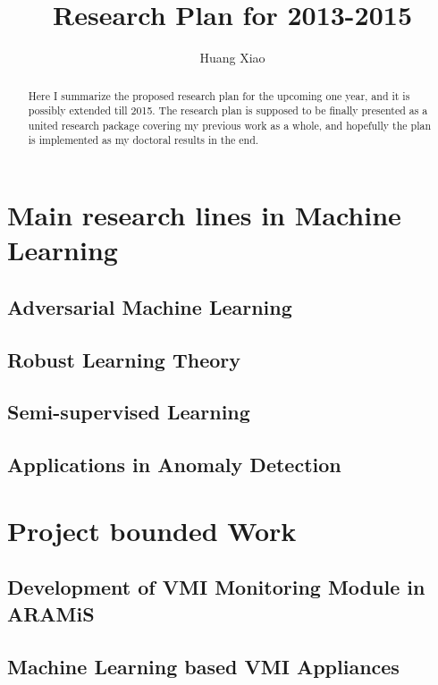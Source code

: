 \documentclass{llncs}
\begin{document}
\title{Research Plan for 2013-2015} 
\author{Huang Xiao} %
\maketitle
\vspace{20mm}
\begin{abstract}
  Here I summarize the proposed research plan for the upcoming one year, and it is possibly extended till 2015. The research plan is supposed to be finally presented as a united research package covering my previous work as a whole, and hopefully the plan is implemented as my doctoral results in the end. 
\end{abstract}
\section{Main research lines in Machine Learning}
\subsection{Adversarial Machine Learning}
\subsection{Robust Learning Theory}
\subsection{Semi-supervised Learning}
\subsection{Applications in Anomaly Detection}

\section{Project bounded Work}
\subsection{Development of VMI Monitoring Module in ARAMiS}
\subsection{Machine Learning based VMI Appliances}
\end{document}
